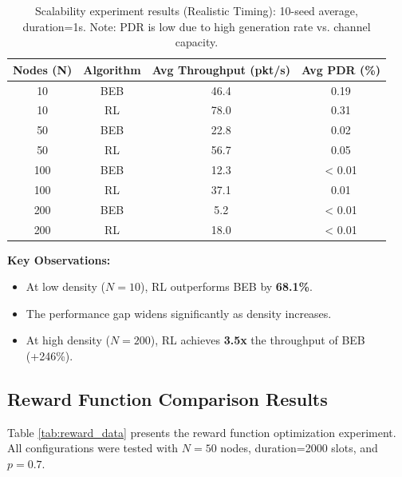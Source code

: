 \documentclass[12pt,a4paper,oneside]{article}
\theoremstyle{definition}
\begin{document}
\begin{table}[H]
    \centering
    \begin{tabular}{|c|c|c|c|}
        \hline
        \textbf{Nodes (N)} & \textbf{Algorithm} & \textbf{Avg Throughput (pkt/s)} & \textbf{Avg PDR (\%)} \\
        \hline
        10 & BEB & 46.4 & 0.19 \\
        10 & RL & 78.0 & 0.31 \\
        \hline
        50 & BEB & 22.8 & 0.02 \\
        50 & RL & 56.7 & 0.05 \\
        \hline
        100 & BEB & 12.3 & < 0.01 \\
        100 & RL & 37.1 & 0.01 \\
        \hline
        200 & BEB & 5.2 & < 0.01 \\
        200 & RL & 18.0 & < 0.01 \\
        \hline
    \end{tabular}
    \caption{Scalability experiment results (Realistic Timing): 10-seed average, duration=1s. Note: PDR is low due to high generation rate vs. channel capacity.}
    \label{tab:scalability_data}
\end{table}

\textbf{Key Observations:}
\begin{itemize}
    \item At low density ($N=10$), RL outperforms BEB by \textbf{68.1\%}.
    \item The performance gap widens significantly as density increases.
    \item At high density ($N=200$), RL achieves \textbf{3.5x} the throughput of BEB (+246\%).
\end{itemize}

\subsection{Reward Function Comparison Results}

Table \ref{tab:reward_data} presents the reward function optimization experiment. All configurations were tested with $N=50$ nodes, duration=2000 slots, and $p=0.7$.
\end{document}
